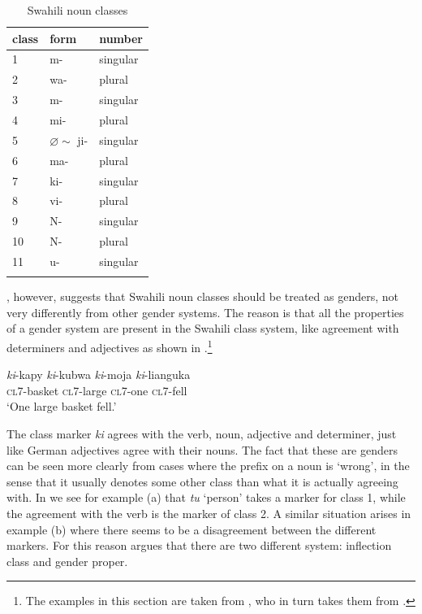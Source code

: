 \begin{table}
  \centering
  \begin{tabular}{lll}
    \lsptoprule
    class & form                   & number   \\
    \midrule
    1     & m-                     & singular \\
    2     & wa-                    & plural   \\
    3     & m-                     & singular \\
    4     & mi-                    & plural   \\
    5     & $\varnothing \sim$ ji- & singular \\
    6     & ma-                    & plural   \\
    7     & ki-                    & singular \\
    8     & vi-                    & plural   \\
    9     & N-                     & singular \\
    10    & N-                     & plural   \\
    11    & u-                     & singular \\
    \lspbottomrule
  \end{tabular}\caption{Swahili noun classes}\label{tab:swahili-classes}
\end{table}

\textcite{Corbett.1991}, however, suggests that Swahili noun classes should be treated as genders, not very differently from other gender systems. The reason is that all the properties of a gender system are present in the Swahili class system, like agreement with determiners and adjectives as shown in .\footnote{The examples in this section are taken from \textcite{Corbett.1991}, who in turn takes them from \textcite[159-183]{Welmers.1973}.}

\begin{exe}
    \ex \label{swahili-class-exe}
    \gll \textit{ki}-kapy \textit{ki}-kubwa \textit{ki}-moja \textit{ki}-lianguka\\
    \textsc{cl7}-basket \textsc{cl7}-large \textsc{cl7}-one \textsc{cl7}-fell\\
    \glt `One large basket fell.'
\end{exe}

The class marker \textit{ki} agrees with the verb, noun, adjective and determiner, just like German adjectives agree with their nouns. The fact that these are genders can be seen more clearly from cases where the prefix on a noun is `wrong', in the sense that it usually denotes some other class than what it is actually agreeing with. In  \autocite[45]{Corbett.1991} we see for example (a) that \textit{tu} `person' takes a marker for class 1, while the agreement with the verb is the marker of class 2. A similar situation arises in example (b) where there seems to be a disagreement between the different markers. For this reason \textcite{Corbett.1991} argues that there are two different system: inflection class and gender proper.

